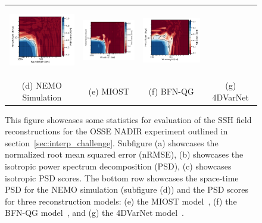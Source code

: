 \begin{figure}[t!]
\begin{center}
\begin{tabular}{cccc}
\includegraphics[trim={20mm 0 34mm 0},clip, width=2.9cm,height=3cm]{00_Oceanbench/content/figures/psd_spacetime/dc20a/nadir4/dc20a_psd_spacetime_score_miost_nadir4_ssh.png} &
\includegraphics[trim={20mm 0 34mm 0},clip, width=2.9cm,height=3cm]{00_Oceanbench/content/figures/psd_spacetime/dc20a/nadir4/dc20a_psd_spacetime_score_bfnqg_nadir4_ssh.png} &
\includegraphics[trim={20mm 0 0 0},clip, width=3.5cm,height=3cm]{00_Oceanbench/content/figures/psd_spacetime/dc20a/nadir4/dc20a_psd_spacetime_score_4dvarnet_nadir4_ssh.png} \\
(d) NEMO Simulation &
(e) MIOST &
(f) BFN-QG &
(g) 4DVarNet
\end{tabular}
\caption{This figure showcases some statistics for evaluation of the SSH field reconstructions for the OSSE NADIR experiment outlined in section~\ref{sec:interp_challenge}. Subfigure (a) showcases the normalized root mean squared error (nRMSE), (b) showcases the isotropic power spectrum decomposition (PSD), (c) showcases isotropic PSD scores.
The bottom row showcases the space-time PSD for the NEMO simulation (subfigure (d)) and the PSD scores for three reconstruction models: (e) the MIOST model~\cite{MIOST}, (f) the BFN-QG model~\cite{BFNQG}, and (g) the 4DVarNet model~\cite{4DVARNETSWOT}.
}
\label{fig:oceanbench_psd}
\end{center}
\end{figure}


